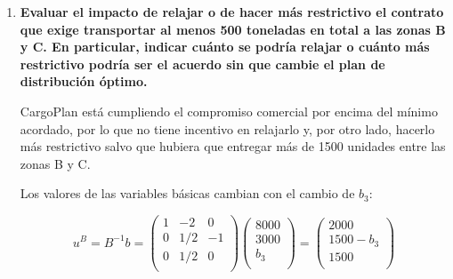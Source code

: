 \begin{enumerate}



    \item \textbf{Evaluar el impacto de relajar o de hacer más restrictivo el contrato que exige transportar al menos 500 toneladas en total a las zonas B y C. En particular, indicar cuánto se podría relajar o cuánto más restrictivo podría ser el acuerdo sin que cambie el plan de distribución óptimo.}

    CargoPlan está cumpliendo el compromiso comercial por encima del mínimo acordado, por lo que no tiene incentivo en relajarlo y, por otro lado, hacerlo más restrictivo salvo que hubiera que entregar más de 1500 unidades entre las zonas B y C.

    Los valores de las variables básicas cambian con el cambio de $b_3$:

    \begin{equation}
    u^B=B^{-1}b = \begin{pmatrix}
    1 & -2 & 0\\
    0 & 1/2 & -1\\
    0 & 1/2 & 0\\
    \end{pmatrix}
    \begin{pmatrix}
    8000\\
    3000\\
    b_3\\
    \end{pmatrix}
     = \begin{pmatrix}
    2000\\
    1500 - b_3\\
    1500\\
    \end{pmatrix}
    \end{equation}


\end{enumerate}
